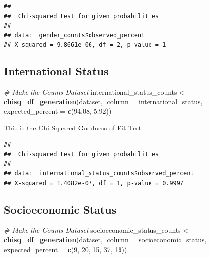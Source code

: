 \documentclass[
  twocolumn]{article}
\newenvironment{Shaded}{\begin{snugshade}}{\end{snugshade}}
\newcommand{\AttributeTok}[1]{\textcolor[rgb]{0.13,0.29,0.53}{#1}}
\newcommand{\CommentTok}[1]{\textcolor[rgb]{0.56,0.35,0.01}{\textit{#1}}}
\newcommand{\DecValTok}[1]{\textcolor[rgb]{0.00,0.00,0.81}{#1}}
\newcommand{\FloatTok}[1]{\textcolor[rgb]{0.00,0.00,0.81}{#1}}
\newcommand{\FunctionTok}[1]{\textcolor[rgb]{0.13,0.29,0.53}{\textbf{#1}}}
\newcommand{\NormalTok}[1]{#1}
\newcommand{\OtherTok}[1]{\textcolor[rgb]{0.56,0.35,0.01}{#1}}
\newcommand{\SpecialCharTok}[1]{\textcolor[rgb]{0.81,0.36,0.00}{\textbf{#1}}}
\begin{document}
\begin{verbatim}
## 
##  Chi-squared test for given probabilities
## 
## data:  gender_counts$observed_percent
## X-squared = 9.8661e-06, df = 2, p-value = 1
\end{verbatim}

\subsection{International Status}\label{international-status}

\begin{Shaded}
\begin{Highlighting}[]
\CommentTok{\# Make the Counts Dataset}
\NormalTok{international\_status\_counts }\OtherTok{\textless{}{-}} \FunctionTok{chisq\_df\_generation}\NormalTok{(dataset, }\AttributeTok{.column =}\NormalTok{ international\_status, }\AttributeTok{expected\_percent =} \FunctionTok{c}\NormalTok{(}\FloatTok{94.08}\NormalTok{, }\FloatTok{5.92}\NormalTok{))}
\end{Highlighting}
\end{Shaded}

This is the Chi Squared Goodness of Fit Test

\begin{Shaded}
\end{Shaded}

\begin{verbatim}
## 
##  Chi-squared test for given probabilities
## 
## data:  international_status_counts$observed_percent
## X-squared = 1.4082e-07, df = 1, p-value = 0.9997
\end{verbatim}

\subsection{Socioeconomic Status}\label{socioeconomic-status}

\begin{Shaded}
\begin{Highlighting}[]
\CommentTok{\# Make the Counts Dataset}
\NormalTok{socioeconomic\_status\_counts }\OtherTok{\textless{}{-}} \FunctionTok{chisq\_df\_generation}\NormalTok{(dataset, }\AttributeTok{.column =}\NormalTok{ socioeconomic\_status, }\AttributeTok{expected\_percent =} \FunctionTok{c}\NormalTok{(}\DecValTok{9}\NormalTok{, }\DecValTok{20}\NormalTok{, }\DecValTok{15}\NormalTok{, }\DecValTok{37}\NormalTok{, }\DecValTok{19}\NormalTok{))}
\end{Highlighting}
\end{Shaded}
\end{document}
